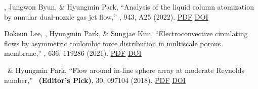 \begin{pubSubsectionNum}
  \item \daehyunchoi, Jungwon Byun, \& Hyungmin Park,
        ``Analysis of the liquid column atomization by annular dual-nozzle gas jet flow,''
        \jfm, 943, A25 \textcolor{BrickRed}{(2022)}.
        \ifshowcontent
          \href{https://dae416.github.io/papers/choi2022a_jfm.pdf}{\underline{PDF}} \href{https://doi.org/10.1017/jfm.2022.435}{\underline{DOI}}
        \fi

  \item Dokeun Lee, \daehyunchoi, Hyungmin Park, \& Sungjae Kim,
        ``Electroconvective circulating flows by asymmetric coulombic force distribution
        in multiscale porous membrane,''
        \jms, 636, 119286 \textcolor{BrickRed}{(2021)}.
        \ifshowcontent
          \href{https://dae416.github.io/papers/lee2021_jms.pdf}{\underline{PDF}} \href{https://doi.org/10.1016/j.memsci.2021.119286}{\underline{DOI}}
        \fi

  \item \daehyunchoi\ \& Hyungmin Park,
        ``Flow around in-line sphere array at moderate Reynolds number,''
        \pof\ \textbf{(Editor's Pick)}, 30, 097104 \textcolor{BrickRed}{(2018)}.
        \ifshowcontent
          \href{https://dae416.github.io/papers/choi2018_pof.pdf}{\underline{PDF}} \href{https://doi.org/10.1063/1.5049734}{\underline{DOI}}
        \fi

\end{pubSubsectionNum}

